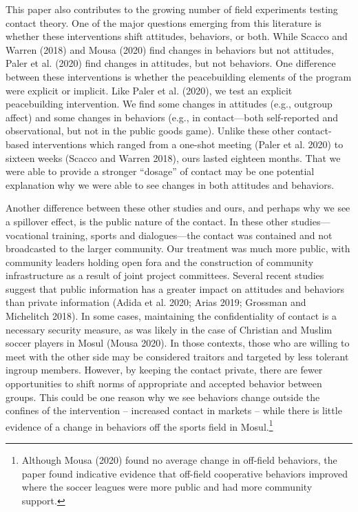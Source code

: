 \documentclass[11pt]{article}
\begin{document}
This paper also contributes to the growing number of field experiments
testing contact theory. One of the major questions emerging from this
literature is whether these interventions shift attitudes, behaviors, or
both. While Scacco and Warren (2018) and Mousa (2020) find changes in
behaviors but not attitudes, Paler et al. (2020) find changes in
attitudes, but not behaviors. One difference between these interventions
is whether the peacebuilding elements of the program were explicit or
implicit. Like Paler et al. (2020), we test an explicit peacebuilding
intervention. We find some changes in attitudes (e.g., outgroup affect)
and some changes in behaviors (e.g., in contact---both self-reported and
observational, but not in the public goods game). Unlike these other
contact-based interventions which ranged from a one-shot meeting (Paler
et al. 2020) to sixteen weeks (Scacco and Warren 2018), ours lasted
eighteen months. That we were able to provide a stronger ``dosage'' of
contact may be one potential explanation why we were able to see changes
in both attitudes and behaviors.

Another difference between these other studies and ours, and perhaps why
we see a spillover effect, is the public nature of the contact. In these
other studies---vocational training, sports and dialogues---the contact
was contained and not broadcasted to the larger community. Our treatment
was much more public, with community leaders holding open fora and the
construction of community infrastructure as a result of joint project
committees. Several recent studies suggest that public information has a
greater impact on attitudes and behaviors than private information
(Adida et al. 2020; Arias 2019; Grossman and Michelitch 2018). In some
cases, maintaining the confidentiality of contact is a necessary
security measure, as was likely in the case of Christian and Muslim
soccer players in Mosul (Mousa 2020). In those contexts, those who are
willing to meet with the other side may be considered traitors and
targeted by less tolerant ingroup members. However, by keeping the
contact private, there are fewer opportunities to shift norms of
appropriate and accepted behavior between groups. This could be one
reason why we see behaviors change outside the confines of the
intervention -- increased contact in markets -- while there is little
evidence of a change in behaviors off the sports field in
Mosul.\footnote{Although Mousa (2020) found no average change in
  off-field behaviors, the paper found indicative evidence that
  off-field cooperative behaviors improved where the soccer leagues were
  more public and had more community support.}
\end{document}
